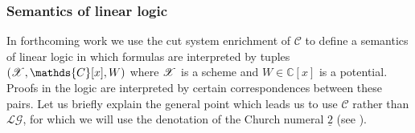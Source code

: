 \documentclass[english,letter paper,12pt,leqno]{article}
\theoremstyle{example}
\numberwithin{equation}{section}
\def\LG{\mathcal{LG}}
\def\nC{\mathds{C}}
\def\L{\mathcal{C}}
\begin{document}



\subsubsection{Semantics of linear logic}

In forthcoming work we use the cut system enrichment of $\L$ to define a semantics of linear logic \cite{girard_llogic} in which formulas are interpreted by tuples $(\md{X}, \nC[x], W)$ where $\mathscr{X}$ is a scheme and $W \in \nC[x]$ is a potential. Proofs in the logic are interpreted by certain correspondences between these pairs. Let us briefly explain the general point which leads us to use $\L$ rather than $\LG$, for which we will use the denotation of the Church numeral $\underline{2}$ (see \cite{murfet_ll}).
\end{document}
